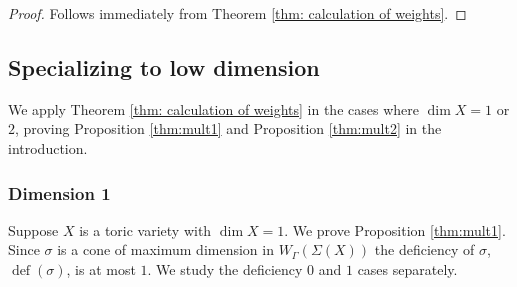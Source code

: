 \documentclass{article}
\newcommand{\defic}[1]{\operatorname{def}(#1)}
\begin{document}
\begin{proof}
    Follows immediately from Theorem \ref{thm: calculation of weights}. 
\end{proof}

\subsection{Specializing to low dimension}

We apply Theorem \ref{thm: calculation of weights} in the cases where $\dim X = 1$ or $2$, proving Proposition \ref{thm:mult1} and Proposition \ref{thm:mult2} in the introduction. 



\subsubsection{Dimension 1} \label{sec: dimension 1}

Suppose $X$ is a toric variety with $\dim X = 1$. We prove Proposition \ref{thm:mult1}. Since  $\sigma$ is a cone of maximum dimension in $W_{\Gamma}(\Sigma(X))$ the deficiency of $\sigma$, $\defic{\sigma}$, is at most $1$. We study the deficiency $0$ and $1$ cases separately.
\end{document}
